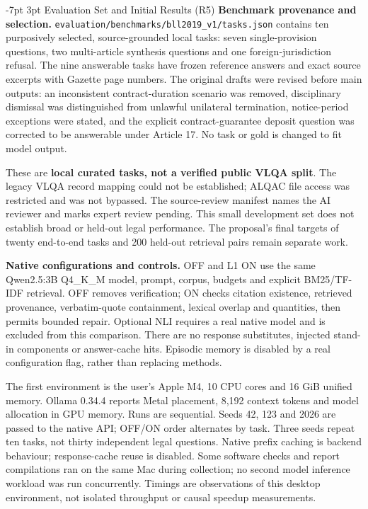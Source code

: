 \documentclass[a4paper,11pt]{article}
\makeatletter
\renewcommand\section{\@startsection{section}{1}{\z@}%
                                   {-7pt \@plus -1pt \@minus -1pt}%
                                   {3pt \@plus 1pt \@minus 1pt}%
                                   {\normalfont\large\bfseries}}
\newcommand{\hdr}[1]{\vspace{2pt}\noindent\textbf{#1}}
\newcommand{\code}[1]{\nolinkurl{#1}}
\makeatother
\begin{document}
\section{Evaluation Set and Initial Results (R5)}
\hdr{Benchmark provenance and selection.}
\code{evaluation/benchmarks/bll2019_v1/tasks.json} contains ten purposively selected, source-grounded local tasks: seven single-provision questions, two multi-article synthesis questions and one foreign-jurisdiction refusal. The nine answerable tasks have frozen reference answers and exact source excerpts with Gazette page numbers. The original drafts were revised before main outputs: an inconsistent contract-duration scenario was removed, disciplinary dismissal was distinguished from unlawful unilateral termination, notice-period exceptions were stated, and the explicit contract-guarantee deposit question was corrected to be answerable under Article 17. No task or gold is changed to fit model output.

These are \textbf{local curated tasks, not a verified public VLQA split}. The legacy VLQA record mapping could not be established; ALQAC file access was restricted and was not bypassed. The source-review manifest names the AI reviewer and marks expert review pending. This small development set does not establish broad or held-out legal performance. The proposal's final targets of twenty end-to-end tasks and 200 held-out retrieval pairs remain separate work.

\hdr{Native configurations and controls.}
OFF and L1 ON use the same Qwen2.5:3B Q4\_K\_M model, prompt, corpus, budgets and explicit BM25/TF-IDF retrieval. OFF removes verification; ON checks citation existence, retrieved provenance, verbatim-quote containment, lexical overlap and quantities, then permits bounded repair. Optional NLI requires a real native model and is excluded from this comparison. There are no response substitutes, injected stand-in components or answer-cache hits. Episodic memory is disabled by a real configuration flag, rather than replacing methods.

The first environment is the user's Apple M4, 10 CPU cores and 16 GiB unified memory. Ollama 0.34.4 reports Metal placement, 8,192 context tokens and model allocation in GPU memory. Runs are sequential. Seeds 42, 123 and 2026 are passed to the native API; OFF/ON order alternates by task. Three seeds repeat ten tasks, not thirty independent legal questions. Native prefix caching is backend behaviour; response-cache reuse is disabled. Some software checks and report compilations ran on the same Mac during collection; no second model inference workload was run concurrently. Timings are observations of this desktop environment, not isolated throughput or causal speedup measurements.
\end{document}
